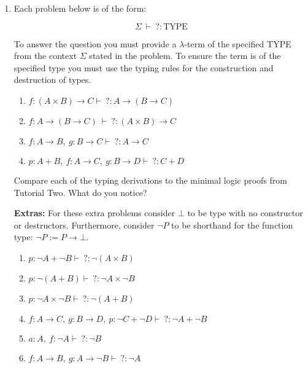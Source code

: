 \documentclass[11pt]{report}
\begin{document}
\begin{enumerate}


	\newpage
	\begin{center}
		{\bf Curry-Howard Correspondence}
	\end{center}

	\item Each problem below is of the form: 
	
	$$ \Sigma \ \vdash \ ? : \text{TYPE}$$

	To answer the question you must provide a $\lambda$-term of the specified TYPE from the context $\Sigma$ stated in the problem. To ensure the term is of the specified type you must use the typing rules for the construction and destruction of types. 
	
		\begin{enumerate}
			\item $f : ( A \times  B) \rightarrow  C \vdash \ ? :  A \rightarrow (B \rightarrow  C)$
			\item $f : A \rightarrow (B \rightarrow  C) \ \vdash \ ? : ( A \times  B) \rightarrow  C$			
			\item $f : A \rightarrow  B, \  g : B \rightarrow  C \vdash \ ? : A \rightarrow  C $
			\item $p : A + B,\ f : A \to  C,\ g : B \to  D \vdash \ ? : C +  D$
		\end{enumerate}
	
	Compare each of the typing derivations to the minimal logic proofs from Tutorial Two. What do you notice? 
	
		{\bf Extras:} For these extra problems consider $\bot$ to be type with no constructor or destructors. Furthermore, consider $\lnot P$ to be shorthand for the function type: $\lnot P:= P \to \bot$.

		\begin{enumerate}
			\item $p : \lnot A + \lnot B \vdash \ ? : \lnot( A \times  B)$
			\item $p : \lnot( A +  B) \vdash \ ? : \lnot  A \times \lnot  B$
			\item $p : \lnot  A \times \lnot  B \vdash \ ? : \lnot( A + B)$
			\item $f : A \to  C,\ g : B \to  D, \ p : \neg C + \neg  D \vdash \ ? :  \neg A + \neg  B$
			\item $ a : A, \ f : \neg  A \vdash \ ? : \neg  B$
			\item $f : A\rightarrow B, \ g : A \rightarrow \lnot B \vdash \ ? : \lnot  A$
		\end{enumerate}



\end{enumerate}
\end{document}
